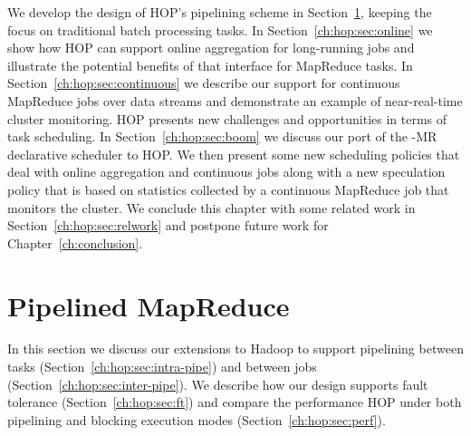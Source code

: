 We develop the design of HOP's pipelining scheme in
Section~\ref{ch:hop:sec:pipelining}, keeping the focus on traditional batch
processing tasks.  In Section~\ref{ch:hop:sec:online} we show how HOP can
support online aggregation for long-running jobs and illustrate the potential
benefits of that interface for MapReduce tasks.  In
Section~\ref{ch:hop:sec:continuous} we describe our support for continuous
MapReduce jobs over data streams and demonstrate an example of near-real-time
cluster monitoring.  HOP presents new challenges and opportunities in terms of
task scheduling.  In Section~\ref{ch:hop:sec:boom} we discuss our port of the
\BOOM-MR declarative scheduler to HOP.  We then present some new scheduling
policies that deal with online aggregation and continuous jobs along with a new
speculation policy that is based on statistics collected by a continuous
MapReduce job that monitors the cluster.  We conclude this chapter with some
related work in Section~\ref{ch:hop:sec:relwork} and postpone future work for
Chapter~\ref{ch:conclusion}.

\section{Pipelined MapReduce}
\label{ch:hop:sec:pipelining}

In this section we discuss our extensions to Hadoop to support pipelining
between tasks (Section~\ref{ch:hop:sec:intra-pipe}) and between jobs
(Section~\ref{ch:hop:sec:inter-pipe}).  We describe how our design supports
fault tolerance (Section~\ref{ch:hop:sec:ft}) and compare the performance HOP
under both pipelining and blocking execution modes
(Section~\ref{ch:hop:sec:perf}).


